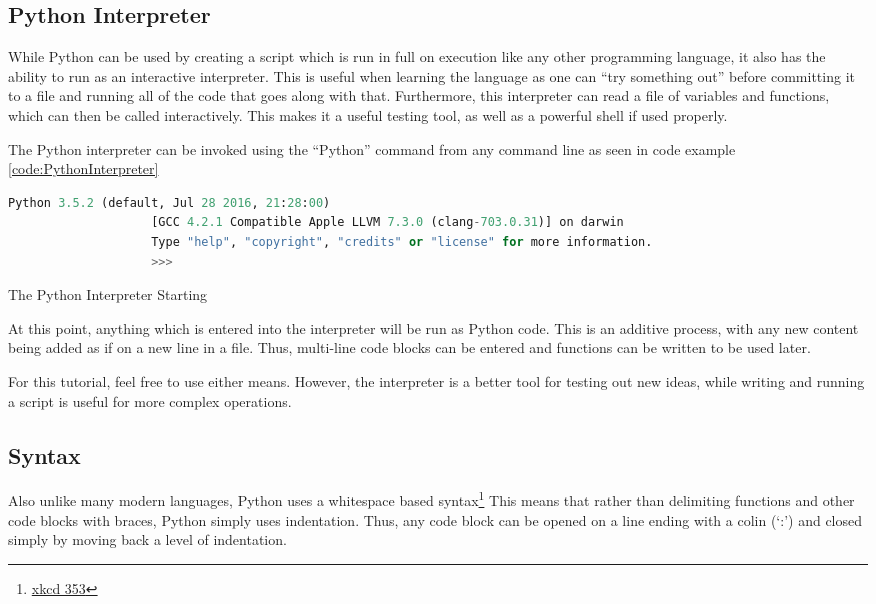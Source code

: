 		\subsection{Python Interpreter}
			While Python can be used by creating a script which is run in full on execution like any other programming language,
			it also has the ability to run as an interactive interpreter.
			This is useful when learning the language as one can ``try something out'' before committing it to a file and running all of the code that goes along with that.
			Furthermore, this interpreter can read a file of variables and functions, which can then be called interactively.
			This makes it a useful testing tool, as well as a powerful shell if used properly.

			The Python interpreter can be invoked using the ``Python'' command from any command line as seen in code example \ref{code:PythonInterpreter}
			\begin{code}
				\begin{lstlisting}[language=Python,gobble=20]
					Python 3.5.2 (default, Jul 28 2016, 21:28:00)
					[GCC 4.2.1 Compatible Apple LLVM 7.3.0 (clang-703.0.31)] on darwin
					Type "help", "copyright", "credits" or "license" for more information.
					>>>
				\end{lstlisting}
				\caption{The Python Interpreter Starting}
				\label{code:PythonInterpreter}
			\end{code}

			At this point, anything which is entered into the interpreter will be run as Python code.
			This is an additive process, with any new content being added as if on a new line in a file.
			Thus, multi-line code blocks can be entered and functions can be written to be used later.

			For this tutorial, feel free to use either means.
			However, the interpreter is a better tool for testing out new ideas, while writing and running a script is useful for more complex operations.
		\subsection{Syntax}
			Also unlike many modern languages, Python uses a whitespace based syntax\footnote{\href{https://www.xkcd.com/353/}{xkcd 353}}
			This means that rather than delimiting functions and other code blocks with braces, Python simply uses indentation.
			Thus, any code block can be opened on a line ending with a colin (`:') and closed simply by moving back a level of indentation.

